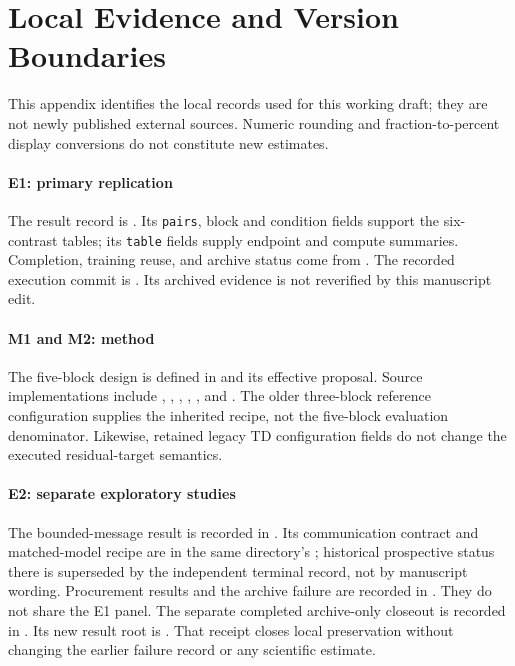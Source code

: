 \documentclass[preprint,12pt]{elsarticle}
\begin{document}
\section{Local Evidence and Version Boundaries}
\label{app:evidence}
This appendix identifies the local records used for this working draft; they
are not newly published external sources. Numeric rounding and fraction-to-percent
display conversions do not constitute new estimates.

\paragraph{E1: primary replication}
The result record is
.
Its \texttt{pairs}, block and condition fields support the six-contrast tables;
its \texttt{table} fields supply endpoint and compute summaries. Completion,
training reuse, and archive status come from
.
The recorded execution commit is
.
Its archived evidence is not reverified by this manuscript edit.

\paragraph{M1 and M2: method}
The five-block design is defined in
and its effective proposal. Source implementations include
,
,
,
,
, and
.
The older three-block reference configuration supplies the inherited recipe,
not the five-block evaluation denominator. Likewise, retained legacy TD
configuration fields do not change the executed residual-target semantics.

\paragraph{E2: separate exploratory studies}
The bounded-message result is recorded in
.
Its communication contract and matched-model recipe are in the same directory's
; historical prospective status there is superseded by
the independent terminal record, not by manuscript wording.
Procurement results and the archive failure are recorded in
.
They do not share the E1 panel. The separate completed archive-only closeout is
recorded in
.
Its new result root is
.
That receipt closes local preservation without changing the earlier failure
record or any scientific estimate.
\end{document}
